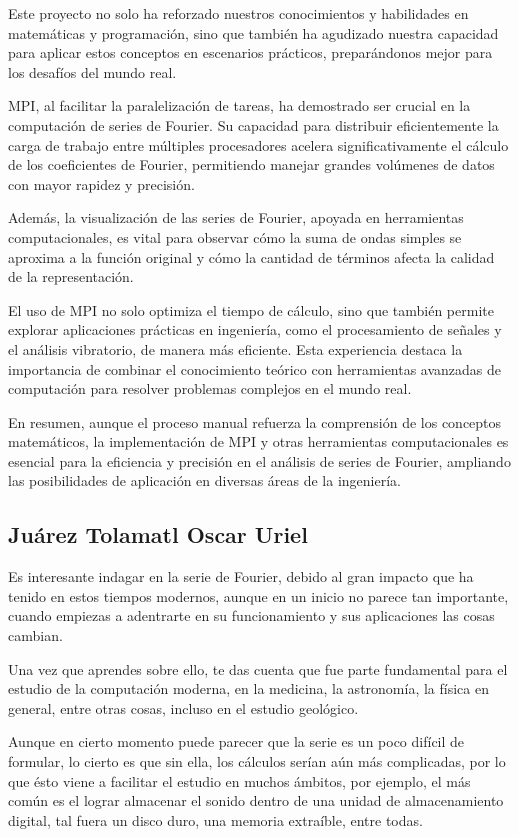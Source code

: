Este proyecto no solo ha reforzado nuestros conocimientos y habilidades en matemáticas y programación, sino que también ha agudizado nuestra capacidad para aplicar estos conceptos en escenarios prácticos, preparándonos mejor para los desafíos del mundo real.

MPI, al facilitar la paralelización de tareas, ha demostrado ser crucial en la computación de series de Fourier. Su capacidad para distribuir eficientemente la carga de trabajo entre múltiples procesadores acelera significativamente el cálculo de los coeficientes de Fourier, permitiendo manejar grandes volúmenes de datos con mayor rapidez y precisión.

Además, la visualización de las series de Fourier, apoyada en herramientas computacionales, es vital para observar cómo la suma de ondas simples se aproxima a la función original y cómo la cantidad de términos afecta la calidad de la representación. 

El uso de MPI no solo optimiza el tiempo de cálculo, sino que también permite explorar aplicaciones prácticas en ingeniería, como el procesamiento de señales y el análisis vibratorio, de manera más eficiente. Esta experiencia destaca la importancia de combinar el conocimiento teórico con herramientas avanzadas de computación para resolver problemas complejos en el mundo real.

En resumen, aunque el proceso manual refuerza la comprensión de los conceptos matemáticos, la implementación de MPI y otras herramientas computacionales es esencial para la eficiencia y precisión en el análisis de series de Fourier, ampliando las posibilidades de aplicación en diversas áreas de la ingeniería.

\subsection{Juárez Tolamatl Oscar Uriel}

Es interesante indagar en la serie de Fourier, debido al gran impacto que ha tenido en estos tiempos modernos, aunque en un inicio no parece tan importante, cuando empiezas a adentrarte en su funcionamiento y sus aplicaciones las cosas cambian.

Una vez que aprendes sobre ello, te das cuenta que fue parte fundamental para el estudio de la computación moderna, en la medicina, la astronomía, la física en general, entre otras cosas, incluso en el estudio geológico.

Aunque en cierto momento puede parecer que la serie es un poco difícil de formular, lo cierto es que sin ella, los cálculos serían aún más complicadas, por lo que ésto viene a facilitar el estudio en muchos ámbitos, por ejemplo, el más común es el lograr almacenar el sonido dentro de una unidad de almacenamiento digital, tal fuera un disco duro, una memoria extraíble, entre todas.

